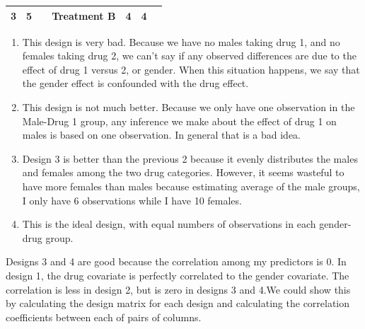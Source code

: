 \documentclass[]{book}
\theoremstyle{definition}
\theoremstyle{definition}
\theoremstyle{remark}
\begin{document}
\begin{longtable}[]{@{}lllllll@{}}
\begin{minipage}[t]{0.08\columnwidth}
3\strut
\end{minipage} & \begin{minipage}[t]{0.09\columnwidth}\raggedright\strut
5\strut
\end{minipage} & \begin{minipage}[t]{0.22\columnwidth}\raggedright\strut
\strut
\end{minipage} & \begin{minipage}[t]{0.13\columnwidth}\raggedright\strut
Treatment B\strut
\end{minipage} & \begin{minipage}[t]{0.07\columnwidth}\raggedright\strut
4\strut
\end{minipage} & \begin{minipage}[t]{0.09\columnwidth}\raggedright\strut
4\strut
\end{minipage}\tabularnewline
\bottomrule
\end{longtable}

\begin{enumerate}
\def\labelenumi{\arabic{enumi}.}
\item
  This design is very bad. Because we have no males taking drug 1, and
  no females taking drug 2, we can't say if any observed differences are
  due to the effect of drug 1 versus 2, or gender. When this situation
  happens, we say that the gender effect is confounded with the drug
  effect.
\item
  This design is not much better. Because we only have one observation
  in the Male-Drug 1 group, any inference we make about the effect of
  drug 1 on males is based on one observation. In general that is a bad
  idea.
\item
  Design 3 is better than the previous 2 because it evenly distributes
  the males and females among the two drug categories. However, it seems
  wasteful to have more females than males because estimating average of
  the male groups, I only have 6 observations while I have 10 females.
\item
  This is the ideal design, with equal numbers of observations in each
  gender-drug group.
\end{enumerate}

Designs 3 and 4 are good because the correlation among my predictors is
0. In design 1, the drug covariate is perfectly correlated to the gender
covariate. The correlation is less in design 2, but is zero in designs 3
and 4.We could show this by calculating the design matrix for each
design and calculating the correlation coefficients between each of
pairs of columns.
\end{document}
